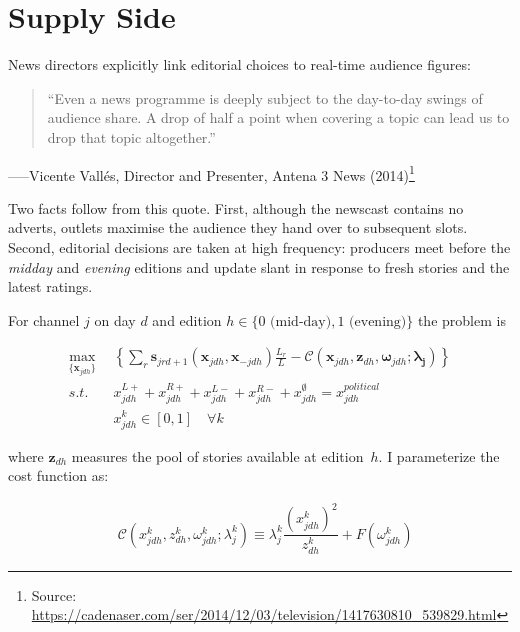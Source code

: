 \documentclass[12pt]{article}
\begin{document}
\section{Supply Side}


\label{sec:supply}

News directors explicitly link editorial choices to real-time audience figures:

\begin{quote}
	“Even a news programme is deeply subject to the day-to-day swings of audience share.  
	A drop of half a point when covering a topic can lead us to drop that topic altogether.”
\end{quote}
\hspace*{\fill}–––Vicente Vallés, Director and Presenter, Antena 3 News (2014)\footnote{Source: \url{https://cadenaser.com/ser/2014/12/03/television/1417630810_539829.html}}

Two facts follow from this quote. First, although the newscast contains no adverts, outlets maximise the audience they hand over to subsequent slots. Second, editorial decisions are taken at high frequency: producers meet before the \emph{midday} and \emph{evening} editions and update slant in response to fresh stories and the latest ratings.


For channel $j$ on day $d$ and edition $h\in\{0\text{ (mid-day)},1\text{ (evening)}\}$ the problem is



\begin{equation}\label{eq:payoffs}
	\begin{aligned}
		\max_{\{\mathbf{x}_{jdh}\}}   & \left\{   \sum_{r}\bm{s}_{jrd+1}(\bm{x}_{jdh}, \bm{x}_{-jdh})\frac{L_r}{L} -  \mathcal{C}\left(  \bm{x}_{jdh},\bm{z}_{dh}, \bm{\omega}_{jdh}; \bm{\lambda_j}   \right)    \right\}\\
		s.t.   \quad &   x_{jdh}^{L+} +x_{jdh}^{R+} + x_{jdh}^{L-} + x_{jdh}^{R-} + x_{jdh}^{\emptyset} = x_{jdh}^{political}\\
		& x_{jdh}^k \in [0,1] \quad \forall k
	\end{aligned}
\end{equation} 






where $\bm z_{dh}$ measures the pool of stories available at edition~$h$.  
I parameterize the cost function as:

\begin{equation*}\label{}
	\begin{aligned}
		& \mathcal{C}(x_{jdh}^k,z_{dh}^k,\omega^k_{jdh}; \lambda_j^k )\equiv   \lambda_j^k  \dfrac{(x_{jdh}^k)^2}{z_{dh}^k} + F(\omega^k_{jdh})
	\end{aligned}
\end{equation*} 
\end{document}

